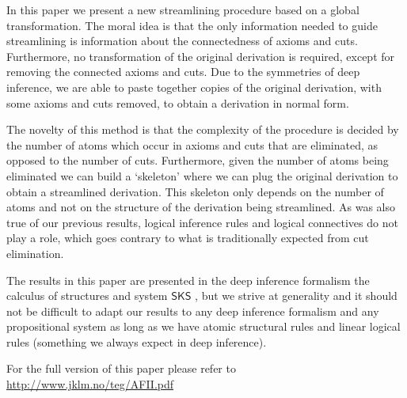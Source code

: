 \documentclass[a4paper]{llncs}
\begin{document}
In this paper we present a new streamlining procedure based on a global transformation. The moral idea is that the only information needed to guide streamlining is information about the connectedness of axioms and cuts. Furthermore, no transformation of the original derivation is required, except for removing the connected axioms and cuts. Due to the symmetries of deep inference, we are able to paste together copies of the original derivation, with some axioms and cuts removed, to obtain a derivation in normal form.

The novelty of this method is that the complexity of the procedure is decided by the number of atoms which occur in axioms and cuts that are eliminated, as opposed to the number of cuts. Furthermore, given the number of atoms being eliminated we can build a `skeleton' where we can plug the original derivation to obtain a streamlined derivation. This skeleton only depends on the number of atoms and not on the structure of the derivation being streamlined. As was also true of our previous results, logical inference rules and logical connectives do not play a role, which goes contrary to what is traditionally expected from cut elimination.

\newcommand{\SKS}{\mathsf{SKS}}
The results in this paper are presented in the deep inference formalism the calculus of structures \cite{Gugl:06:A-System:kl} and system $\SKS$ \cite{BrunTiu:01:A-Local-:mz}, but we strive at generality and it should not be difficult to adapt our results to any deep inference formalism and any propositional system as long as we have atomic structural rules and linear logical rules (something we always expect in deep inference).

For the full version of this paper please refer to \url{http://www.jklm.no/teg/AFII.pdf}




\end{document}
